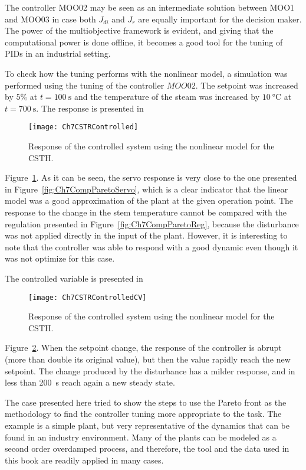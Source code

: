 The controller MOO02 may be seen as an intermediate solution between MOO1 and MOO03 in case both $J_{di}$ and $J_r$ are equally important for the decision maker. The power of the multiobjective framework is evident, and giving that the computational power is done offline, it becomes a good tool for the tuning of PIDs in an industrial setting.

To check how the tuning performs with the nonlinear model, a simulation was performed using the tuning of the controller $MOO02$. The setpoint was increased by $5\%$ at $t=\SI{100}{\second}$ and the temperature of the steam was increased by $\SI{10}{\celsius}$ at $t=\SI{700}{\second}$. The response is presented in %
\begin{figure}[tb]
	\centering
	\texttt{[image: Ch7CSTRControlled]}
	\caption{Response of the controlled system using the nonlinear model for the CSTH.}
	\label{fig:Ch7CSTRControlled}
\end{figure}
%
Figure~\ref{fig:Ch7CSTRControlled}. As it can be seen, the servo response is very close to the one presented in Figure~\ref{fig:Ch7CompParetoServo}, which is a clear indicator that the linear model was a good approximation of the plant at the given operation point. The response to the change in the stem temperature cannot be compared with the regulation presented in Figure~\ref{fig:Ch7CompParetoReg}, because the disturbance was not applied directly in the input of the plant. However, it is interesting to note that the controller was able to respond with a good dynamic even though it was not optimize for this case.

The controlled variable is presented in %
\begin{figure}[tb]
	\centering
	\texttt{[image: Ch7CSTRControlledCV]}
	\caption{Response of the controlled system using the nonlinear model for the CSTH.}
	\label{fig:Ch7CSTRControlledCV}
\end{figure}
%
Figure~\ref{fig:Ch7CSTRControlledCV}. When the setpoint change, the response of the controller is abrupt (more than double its original value), but then the value rapidly reach the new setpoint. The change produced by the disturbance has a milder response, and in less than \SI{200}{\second} reach again a new steady state.

The case presented here tried to show the steps to use the Pareto front as the methodology to find the controller tuning more appropriate to the task. The example is a simple plant, but very representative of the dynamics that can be found in an industry environment. Many of the plants can be modeled as a second order overdamped process, and therefore, the tool and the data used in this book are readily applied in many cases.

